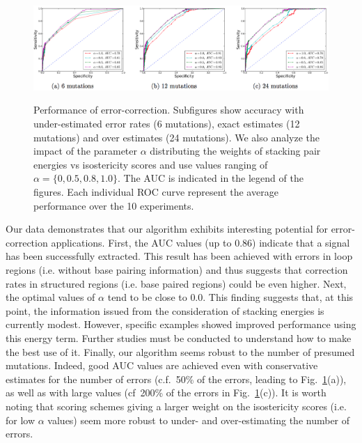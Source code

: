 \begin{figure}
\centering
	\includegraphics[width=\textwidth]{subfigs_perform.png}\\

\caption{Performance of error-correction. Subfigures show accuracy with under-estimated error rates (6 mutations), exact estimates (12 mutations) and over estimates 
(24 mutations). We also analyze the impact of the parameter $\alpha$ distributing the weights of stacking pair energies vs isostericity scores and use values 
ranging of $\alpha=\{0,0.5,0.8,1.0\}$. The AUC is indicated in the legend of the figures. Each individual ROC curve represent the average performance over the 10 experiments.}
\label{fig:ROCall}\SpaceCheating
\end{figure}

Our data demonstrates that our algorithm exhibits interesting potential for error-correction applications. First, the AUC values (up to $0.86$) indicate that a
signal has been successfully extracted. This result has been achieved with errors in loop regions (i.e. without base pairing information) and thus suggests
that correction rates in structured regions (i.e. base paired regions) could be even higher. Next, the optimal values of $\alpha$ tend to be close to $0.0$. This 
finding suggests that, at this point, the information issued from the consideration of stacking energies is currently modest. However, specific examples showed improved performance
using this energy term. Further studies must be conducted to understand how to make the best use of it. Finally, our algorithm seems robust to the number of
presumed mutations. Indeed, good AUC values are achieved even with conservative estimates for the number of errors (c.f.~50\% of the errors, leading to 
Fig.~\ref{fig:ROCall}(a)), as well as with large  values (cf~200\% of the errors  in Fig.~\ref{fig:ROCall}(c)). It is worth noting that scoring schemes giving a larger weight on
the isostericity scores (i.e. for low $\alpha$ values) seem more robust to under- and over-estimating the number of errors.

